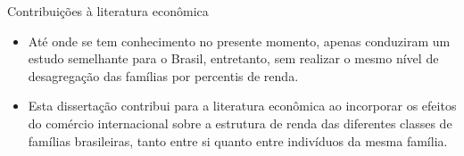 \documentclass[10pt]{sintefbeamer}
\begin{document}
\begin{frame}{Contribuições à literatura econômica}
	\begin{itemize}
		\item Até onde se tem conhecimento no presente momento, apenas \textcite{carneiro06, ferreira06} conduziram um estudo semelhante para o Brasil, entretanto, sem realizar o mesmo nível de desagregação das famílias por percentis de renda.
		
		\item Esta dissertação contribui para a literatura econômica ao incorporar os efeitos do comércio internacional sobre a estrutura de renda das diferentes classes de famílias brasileiras, tanto entre si quanto entre indivíduos da mesma família.
	\end{itemize}
\end{frame}








%	
%	
%		
%
%
%		
\end{document}
